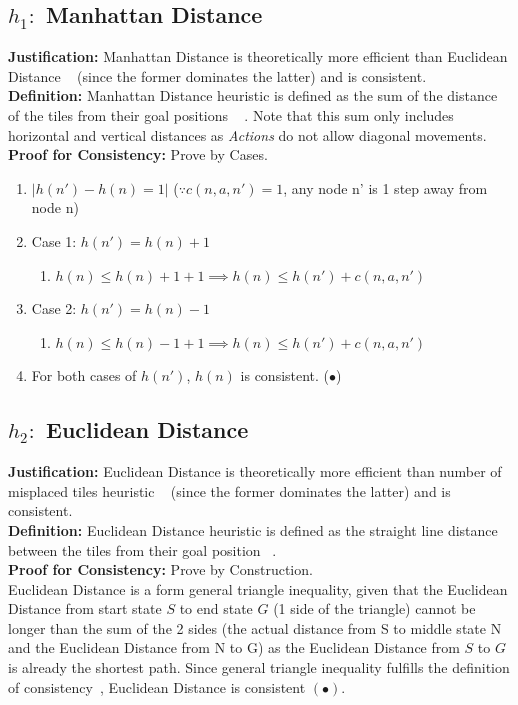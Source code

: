 \documentclass[runningheads]{llncs}
\begin{document}
\subsection{\(h_1:\) Manhattan Distance} 
\textbf{Justification:} Manhattan Distance is theoretically more efficient than Euclidean Distance ~\cite[p104]{stuart_russell_artifical_2010} (since the former dominates the latter) and is consistent. \\
\textbf{Definition:} Manhattan Distance heuristic is defined as the sum of the distance of the tiles from their goal positions ~\cite[p103]{stuart_russell_artifical_2010} . Note that this sum only includes horizontal and vertical distances as \textit{Actions} do not allow diagonal movements. \\
\textbf{Proof for Consistency:} Prove by Cases.
\begin{enumerate}
    \item \( |h(n') - h(n) = 1| \) (\( \because c(n, a, n') = 1 \), any node n' is 1 step away from node n)
    \item Case 1: \( h(n') = h(n) + 1 \)
    \begin{enumerate}
        \item \( h(n) \leq h(n) + 1 + 1 \implies h(n) \leq h(n') + c(n, a, n') \)
    \end{enumerate}
    \item Case 2: \( h(n') = h(n) - 1 \)
    \begin{enumerate}
        \item \( h(n) \leq h(n) - 1 + 1 \implies h(n) \leq h(n') + c(n, a, n') \)
    \end{enumerate}
    \item For both cases of \( h(n') \), \( h(n) \) is consistent. (\(\bullet\))
\end{enumerate}

\subsection{\(h_2:\) Euclidean Distance}
\textbf{Justification:} Euclidean Distance is theoretically more efficient than number of misplaced tiles heuristic ~\cite[p104]{stuart_russell_artifical_2010} (since the former dominates the latter) and is consistent. \\
\textbf{Definition:} Euclidean Distance heuristic is defined as the straight line distance between the tiles from their goal position ~\cite{rosalind_euclidean_nodate}. \\
\textbf{Proof for Consistency:} Prove by Construction. \\
Euclidean Distance is a form general triangle inequality, given that the Euclidean Distance from start state \( S \) to end state \( G \) (1 side of the triangle) cannot be longer than the sum of the 2 sides (the actual distance from S to middle state N and the Euclidean Distance from N to G) as the Euclidean Distance from \( S \) to \( G \) is already the shortest path. 
Since general triangle inequality fulfills the definition of consistency~\cite[p95]{stuart_russell_artifical_2010}, Euclidean Distance is consistent \( (\bullet) \).
\end{document}
